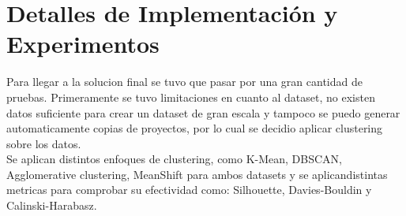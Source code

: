 \chapter{Detalles de Implementación y Experimentos}\label{chapter:implementation}

Para llegar a la solucion final se tuvo que pasar por una gran cantidad de pruebas. Primeramente se tuvo limitaciones en cuanto al dataset, no existen datos suficiente para crear un dataset de gran escala y tampoco se puedo generar automaticamente copias de proyectos, por lo cual se decidio aplicar clustering sobre los datos. \\

	Se aplican distintos enfoques de clustering, como K-Mean, DBSCAN, Agglomerative clustering, MeanShift para ambos datasets y se aplicandistintas metricas para comprobar su efectividad como: Silhouette, Davies-Bouldin y Calinski-Harabasz.
 